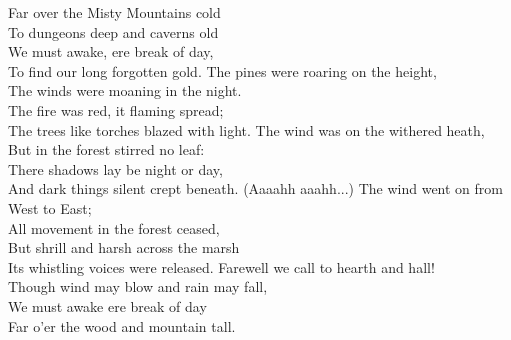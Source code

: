 \begin{flushleft}
Far over the Misty Mountains cold\\
To dungeons deep and caverns old\\
We must awake, ere break of day,\\
To find our long forgotten gold.
\hops
The pines were roaring on the height,\\
The winds were moaning in the night.\\
The fire was red, it flaming spread;\\
The trees like torches blazed with light.
\hops
The wind was on the withered heath,\\
But in the forest stirred no leaf:\\
There shadows lay be night or day,\\
And dark things silent crept beneath.
\hops
(Aaaahh aaahh...)
\hops
The wind went on from West to East;\\
All movement in the forest ceased,\\
But shrill and harsh across the marsh\\
Its whistling voices were released.
\hops
Farewell we call to hearth and hall!\\
Though wind may blow and rain may fall,\\
We must awake ere break of day\\
Far o'er the wood and mountain tall.
\end{flushleft}
\newpage